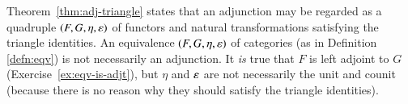 \begin{remark}  
\label{rmk:eqvs-vs-adjts}
%
%
%
%
Theorem~\ref{thm:adj-triangle} states that an adjunction may be regarded as
a quadruple $(F, G, \eta, \varepsilon)$ of functors and natural transformations
satisfying the triangle identities.  An equivalence $(F, G, \eta, \varepsilon)$
of categories (as in Definition \ref{defn:eqv}) is not necessarily an
adjunction.  It \emph{is} true that $F$ is left adjoint to $G$
(Exercise~\ref{ex:eqv-is-adjt}), but $\eta$ and $\varepsilon$ are not
necessarily the unit and counit (because there is no reason why they should
satisfy the triangle identities).
\end{remark}

